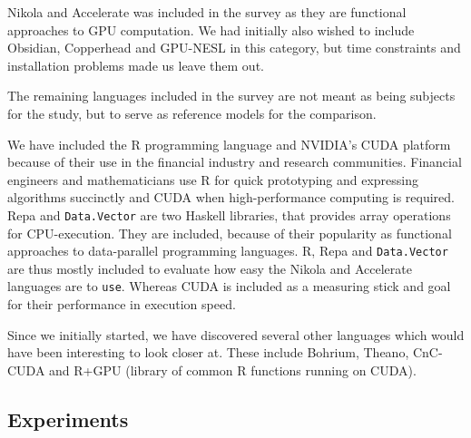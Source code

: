 Nikola and Accelerate was included in the survey as they are
functional approaches to GPU computation. We had initially also wished
to include Obsidian, Copperhead and GPU-NESL in this category, but
time constraints and installation problems made us leave them out.

The remaining languages included in the survey are not meant as being
subjects for the study, but to serve as reference models for the
comparison.

We have included the R programming language and NVIDIA's CUDA platform
because of their use in the financial industry and research
communities. Financial engineers and mathematicians use R for quick
prototyping and expressing algorithms succinctly and CUDA when
high-performance computing is required. Repa and \texttt{Data.Vector}
are two Haskell libraries, that provides array operations for
CPU-execution. They are included, because of their popularity as
functional approaches to data-parallel programming languages. R, Repa
and \texttt{Data.Vector} are thus mostly included to evaluate how easy
the Nikola and Accelerate languages are to \texttt{use}. Whereas CUDA
is included as a measuring stick and goal for their performance in
execution speed.

Since we initially started, we have discovered several other languages
which would have been interesting to look closer at. These include
Bohrium, Theano, CnC-CUDA and R+GPU (library of common R functions
running on CUDA).

\subsection{Experiments} %
%
%



